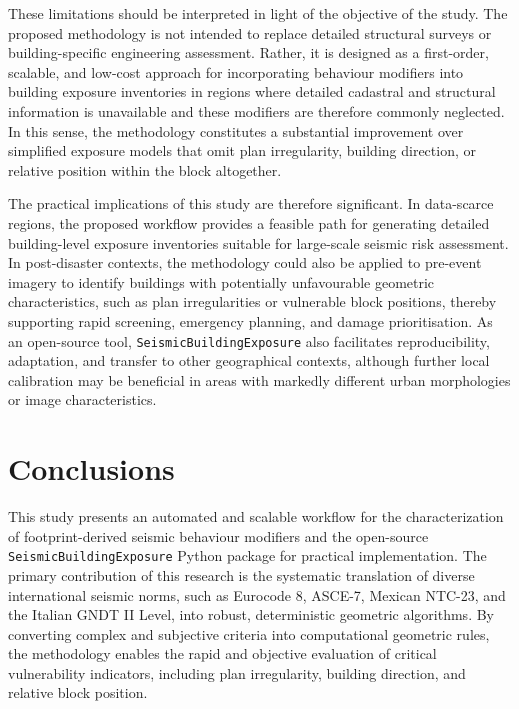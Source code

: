 \begin{refsection}
These limitations should be interpreted in light of the objective of the study. The proposed methodology is not intended to replace detailed structural surveys or building-specific engineering assessment. Rather, it is designed as a first-order, scalable, and low-cost approach for incorporating behaviour modifiers into building exposure inventories in regions where detailed cadastral and structural information is unavailable and these modifiers are therefore commonly neglected. In this sense, the methodology constitutes a substantial improvement over simplified exposure models that omit plan irregularity, building direction, or relative position within the block altogether.

The practical implications of this study are therefore significant. In data-scarce regions, the proposed workflow provides a feasible path for generating detailed building-level exposure inventories suitable for large-scale seismic risk assessment. In post-disaster contexts, the methodology could also be applied to pre-event imagery to identify buildings with potentially unfavourable geometric characteristics, such as plan irregularities or vulnerable block positions, thereby supporting rapid screening, emergency planning, and damage prioritisation. As an open-source tool, \texttt{SeismicBuildingExposure} also facilitates reproducibility, adaptation, and transfer to other geographical contexts, although further local calibration may be beneficial in areas with markedly different urban morphologies or image characteristics.

\renewcommand{\sectionnametext}{Conclusions}
\renewcommand{\headingtextR}{\thesection. \sectionnametext}
\section{\sectionnametext}

This study presents an automated and scalable workflow for the characterization of footprint-derived seismic behaviour modifiers and the open-source \texttt{SeismicBuildingExposure} Python package for practical implementation. The primary contribution of this research is the systematic translation of diverse international seismic norms, such as Eurocode 8, ASCE-7, Mexican NTC-23, and the Italian GNDT II Level, into robust, deterministic geometric algorithms. By converting complex and subjective criteria into computational geometric rules, the methodology enables the rapid and objective evaluation of critical vulnerability indicators, including plan irregularity, building direction, and relative block position.


\end{refsection}
